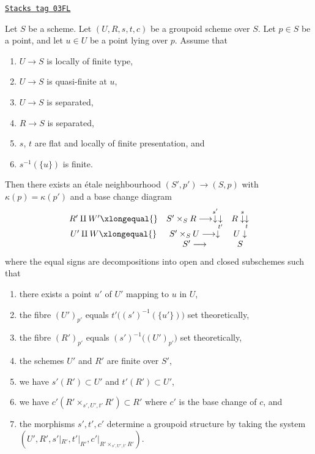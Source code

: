 \begin{lemma}
\label{more-groupoids-lemma-quasi-finite-over-base}
\href{https://stacks.math.columbia.edu/tag/03FL}{\texttt{Stacks tag 03FL}}

Let $S$ be a scheme.
Let $(U, R, s, t, c)$ be a groupoid scheme over $S$.
Let $p \in S$ be a point, and let $u \in U$ be a point lying over $p$.
Assume that
\begin{enumerate}
\item $U \to S$ is locally of finite type,
\item $U \to S$ is quasi-finite at $u$,
\item $U \to S$ is separated,
\item $R \to S$ is separated,
\item $s$, $t$ are flat and locally of finite presentation, and
\item $s^{-1}(\{u\})$ is finite.
\end{enumerate}
Then there exists an \'etale neighbourhood $(S', p') \to (S, p)$ with
$\kappa(p) = \kappa(p')$ and a base change diagram
$$
\begin{array}{ccc}R' \amalg W'
\xlongequal{} & S' \times_S R
\longrightarrow\overset{s'}{\downarrow}\underset{t'}{\downarrow} & R \overset{s}{\downarrow}\underset{t}{\downarrow} \\ U' \amalg W
\xlongequal{} & S' \times_S U
\longrightarrow\downarrow & U \downarrow \\  & S' \longrightarrow & S\end{array}
$$
where the equal signs are decompositions into open and closed
subschemes such that
\begin{enumerate}
\item[(a)] there exists a point $u'$ of $U'$ mapping to $u$ in $U$,
\item[(b)] the fibre $(U')_{p'}$ equals $t'\big((s')^{-1}(\{u'\})\big)$
set theoretically,
\item[(c)] the fibre $(R')_{p'}$ equals $(s')^{-1}\big((U')_{p'}\big)$
set theoretically,
\item[(d)] the schemes $U'$ and $R'$ are finite over $S'$,
\item[(e)] we have $s'(R') \subset U'$ and $t'(R') \subset U'$,
\item[(f)] we have
$c'(R' \times_{s', U', t'} R') \subset R'$
where $c'$ is the base change of $c$, and
\item[(g)] the morphisms $s', t', c'$ determine a groupoid structure
by taking the system
$(U', R', s'|_{R'}, t'|_{R'}, c'|_{R' \times_{s', U', t'} R'})$.
\end{enumerate}
\end{lemma}

